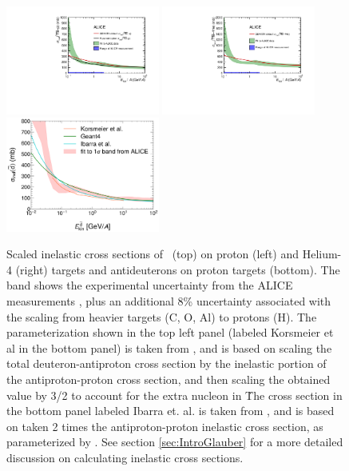 \begin{figure}
    \centering
    \includegraphics[width=0.45\textwidth]{figures/Antihelum_on_p_targets_scaled_with_paramterisation.pdf}
    \includegraphics[width=0.45\textwidth]{figures/Antihelum_on_p_targets_scaled.pdf}
    \includegraphics[width=0.45\textwidth]{figures/dbar_xs_comparison_dbarNotInLabels.png}
    \caption{Scaled inelastic cross sections of \ahe\ (top) on proton (left) and Helium-4 (right) targets and antideuterons on proton targets (bottom). The band shows the experimental uncertainty from the ALICE measurements \cite{antideuteronXS, antiHe3XS}, plus an additional 8\% uncertainty associated with the scaling from heavier targets (C, O, Al) to protons (H). The parameterization shown in the top left panel (labeled Korsmeier et al in the bottom panel) is taken from \cite{Korsmeier2018}, and is based on scaling the total deuteron-antiproton cross section by the inelastic portion of the antiproton-proton cross section, and then scaling the obtained value by 3/2 to account for the extra nucleon in \ahe\. The cross section in the bottom panel labeled Ibarra et. al. is taken from \cite{Ibarra:2012cc}, and is based on taken 2 times the antiproton-proton inelastic cross section, as parameterized by \cite{Tan_1983}. See section \ref{sec:IntroGlauber} for a more detailed discussion on calculating inelastic cross sections.}
    \label{fig:ScaledXS_ahe_adeut}
\end{figure}

